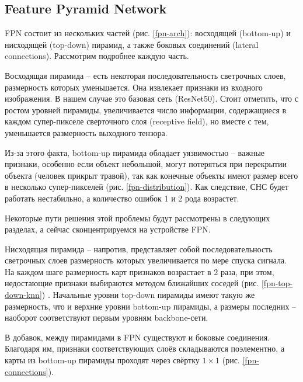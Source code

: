 \subsection{Feature Pyramid Network} \label{sect-5-2}

FPN состоит из нескольких частей (рис. \ref{fpn-arch}): восходящей (bottom-up) и нисходящей (top-down) пирамид, а также боковых соединений (lateral connections). Рассмотрим подробнее каждую часть.


Восходящая пирамида -- есть некоторая последовательность светрочных слоев, размерность которых уменьшается. Она  извлекает признаки из входного изображения. В нашем случае это базовая сеть (ResNet50). Стоит отметить, что с ростом уровней пирамиды, увеличивается число информации, содержащиеся в каждом супер-пикселе сверточного слоя (receptive field), но вместе с тем, уменьшается размерность выходного тензора.

Из-за этого факта, bottom-up пирамида обладает уязвимостью -- важные признаки, особенно если объект небольшой, могут потеряться при перекрытии объекта (человек прикрыт травой), так как конечные объекты имеют размер всего в несколько супер-пикселей (рис. \ref{fpn-distribution}). Как следствие, СНС будет работать нестабильно, а количество ошибок 1 и 2 рода возрастет. 


Некоторые пути решения этой проблемы будут рассмотрены в следующих разделах, а сейчас сконцентрируемся на устройстве FPN.

Нисходящая пирамида -- напротив, представляет собой последовательность светрочных слоев размерность которых увеличивается по мере спуска сигнала. На каждом шаге размерность карт признаков возрастает в 2 раза, при этом, недостающие признаки выбираются методом ближайших соседей (рис. \ref{fpn-top-down-knn}) \cite{lib-knn}. Начальные уровни top-down пирамиды имеют такую же размерность, что и верхние уровни bottom-up пирамиды, а размеры последних -- наоборот соответствуют первым уровням backbone-сети.


В добавок, между пирамидами в FPN существуют и боковые соединения. Благодаря им, признаки соответствующих слоёв складываются поэлементно, а карты из bottom-up пирамиды проходят через свёртку $1 \times 1$ (рис. \ref{fpn-connections}).


